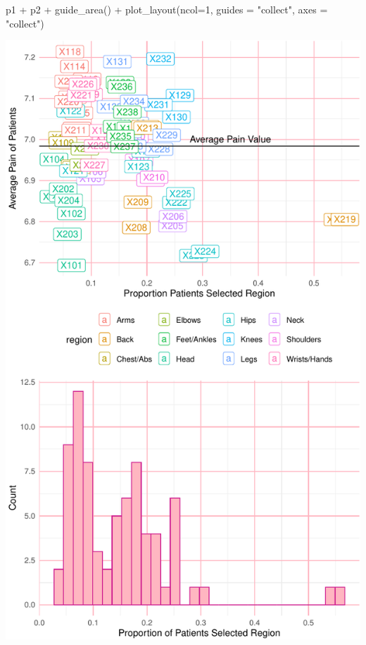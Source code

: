 \documentclass[
  letterpaper,
]{latex/krantz}
\makeatletter
\newenvironment{Shaded}{\begin{snugshade}}{\end{snugshade}}
\newcommand{\AttributeTok}[1]{\textcolor[rgb]{0.40,0.45,0.13}{#1}}
\newcommand{\DecValTok}[1]{\textcolor[rgb]{0.68,0.00,0.00}{#1}}
\newcommand{\FunctionTok}[1]{\textcolor[rgb]{0.28,0.35,0.67}{#1}}
\newcommand{\NormalTok}[1]{\textcolor[rgb]{0.00,0.23,0.31}{#1}}
\newcommand{\SpecialCharTok}[1]{\textcolor[rgb]{0.37,0.37,0.37}{#1}}
\newcommand{\StringTok}[1]{\textcolor[rgb]{0.13,0.47,0.30}{#1}}
\newenvironment{kframe}{%
\medskip{}
\setlength{\fboxsep}{.8em}
 \def\at@end@of@kframe{}%
 \ifinner\ifhmode%
  \def\at@end@of@kframe{\end{minipage}}%
  \begin{minipage}{\columnwidth}%
 \fi\fi%
 \def\FrameCommand##1{\hskip\@totalleftmargin \hskip-\fboxsep
 \colorbox{shadecolor}{##1}\hskip-\fboxsep
     \hskip-\linewidth \hskip-\@totalleftmargin \hskip\columnwidth}%
 \MakeFramed {\advance\hsize-\width
   \@totalleftmargin\z@ \linewidth\hsize
   \@setminipage}}%
 {\par\unskip\endMakeFramed%
 \at@end@of@kframe}
\renewenvironment{Shaded}{\begin{kframe}}{\end{kframe}}
\makeatother
\begin{document}
\begin{Shaded}
\begin{Highlighting}[]
\NormalTok{p1 }\SpecialCharTok{+}\NormalTok{ p2 }\SpecialCharTok{+} \FunctionTok{guide\_area}\NormalTok{() }\SpecialCharTok{+} \FunctionTok{plot\_layout}\NormalTok{(}\AttributeTok{ncol=}\DecValTok{1}\NormalTok{, }\AttributeTok{guides =} \StringTok{"collect"}\NormalTok{,}
                                     \AttributeTok{axes =} \StringTok{"collect"}\NormalTok{)}
\end{Highlighting}
\end{Shaded}

\begin{center}
\includegraphics[width=1\textwidth,height=\textheight]{book/visualization_ggplot_files/figure-pdf/unnamed-chunk-24-1.pdf}
\end{center}
\end{document}
